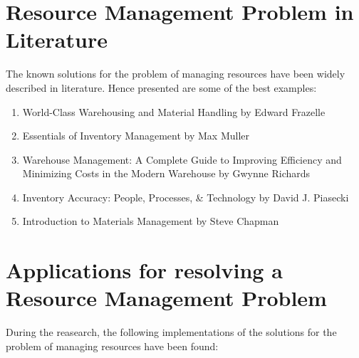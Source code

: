 \documentclass[a4paper,11pt,twoside]{report}
\theoremstyle{definition}
\begin{document}
\section{Resource Management Problem in Literature}

The known solutions for the problem of managing resources have been widely described in literature. Hence presented are some of the best examples:

\begin{enumerate}

\item World-Class Warehousing and Material Handling by Edward Frazelle
\item Essentials of Inventory Management by Max Muller
\item Warehouse Management: A Complete Guide to Improving Efficiency and Minimizing Costs in the Modern Warehouse by Gwynne Richards
\item Inventory Accuracy: People, Processes, \& Technology by David J. Piasecki
\item Introduction to Materials Management by Steve Chapman 
\end{enumerate}

\section{Applications for resolving a Resource Management Problem}

During the reasearch, the following implementations of the solutions for the problem of managing resources have been found:
\end{document}
